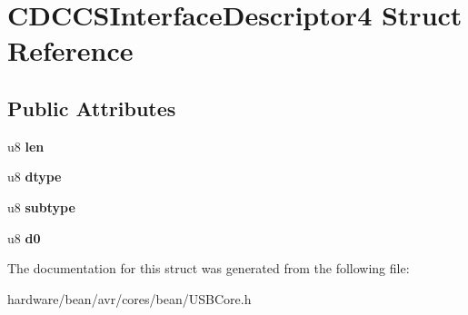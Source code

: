 \hypertarget{struct_c_d_c_c_s_interface_descriptor4}{}\section{C\+D\+C\+C\+S\+Interface\+Descriptor4 Struct Reference}
\label{struct_c_d_c_c_s_interface_descriptor4}
\subsection*{Public Attributes}
\begin{DoxyCompactItemize}
\item 
\hypertarget{struct_c_d_c_c_s_interface_descriptor4_ab89f7893f8e283d7f1fb84e43893766e}{}u8 {\bfseries len}\label{struct_c_d_c_c_s_interface_descriptor4_ab89f7893f8e283d7f1fb84e43893766e}

\item 
\hypertarget{struct_c_d_c_c_s_interface_descriptor4_a17152b2ca4d4535c5f9213c75765f117}{}u8 {\bfseries dtype}\label{struct_c_d_c_c_s_interface_descriptor4_a17152b2ca4d4535c5f9213c75765f117}

\item 
\hypertarget{struct_c_d_c_c_s_interface_descriptor4_a4cc0147f4d3e90e2c17a830ea5eff849}{}u8 {\bfseries subtype}\label{struct_c_d_c_c_s_interface_descriptor4_a4cc0147f4d3e90e2c17a830ea5eff849}

\item 
\hypertarget{struct_c_d_c_c_s_interface_descriptor4_ad89b10b6c73a0c8c5df3fe5aae322957}{}u8 {\bfseries d0}\label{struct_c_d_c_c_s_interface_descriptor4_ad89b10b6c73a0c8c5df3fe5aae322957}

\end{DoxyCompactItemize}


The documentation for this struct was generated from the following file\+:\begin{DoxyCompactItemize}
\item 
hardware/bean/avr/cores/bean/U\+S\+B\+Core.\+h\end{DoxyCompactItemize}
